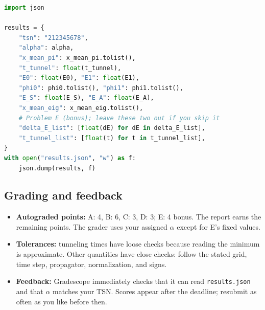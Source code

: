 \begin{lstlisting}[language=Python]
import json

results = {
    "tsn": "212345678",
    "alpha": alpha,
    "x_mean_pi": x_mean_pi.tolist(),
    "t_tunnel": float(t_tunnel),
    "E0": float(E0), "E1": float(E1),
    "phi0": phi0.tolist(), "phi1": phi1.tolist(),
    "E_S": float(E_S), "E_A": float(E_A),
    "x_mean_eig": x_mean_eig.tolist(),
    # Problem E (bonus); leave these two out if you skip it
    "delta_E_list": [float(dE) for dE in delta_E_list],
    "t_tunnel_list": [float(t) for t in t_tunnel_list],
}
with open("results.json", "w") as f:
    json.dump(results, f)
\end{lstlisting}

\subsection*{Grading and feedback}
\begin{itemize}
  \item \textbf{Autograded points:} A: 4, B: 6, C: 3, D: 3; E: 4 bonus.
        The report earns the remaining points. The grader uses your assigned $\alpha$ except for E's fixed values.
  \item \textbf{Tolerances:} tunneling times have loose checks because reading the minimum is approximate.
        Other quantities have close checks: follow the stated grid, time step, propagator, normalization, and signs.
  \item \textbf{Feedback:} Gradescope immediately checks that it can read \texttt{results.json} and that $\alpha$ matches your TSN.
        Scores appear after the deadline; resubmit as often as you like before then.
\end{itemize}


